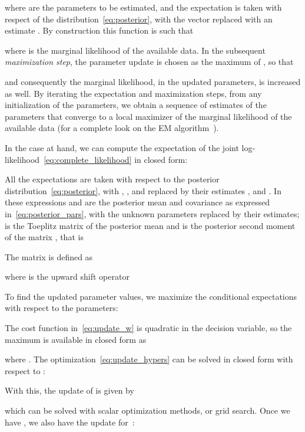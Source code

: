 \documentclass[10pt]{article}
\begin{document}
where  are the parameters to be estimated, and
the expectation is taken with respect of the distribution~\eqref{eq:posterior},
with the vector  replaced with an estimate . By
construction this function
is such that

where  is the marginal likelihood of the available data.
In the subsequent \emph{maximization step}, the parameter update is chosen as
the maximum of , so that

and consequently the marginal likelihood, in the updated parameters, is increased as well.
By iterating the expectation and maximization steps, from any initialization of
the parameters, we obtain a sequence of estimates of the parameters that
converge to a local maximizer of the marginal likelihood of the available data (for a
complete look on the EM algorithm~\cite{mclachlan2007algorithm}).

In the case at hand, we can compute the expectation of the joint log-likelihood~\eqref{eq:complete_likelihood} in closed form:

All the expectations are taken with respect to the posterior
distribution~\eqref{eq:posterior}, with , , and  replaced by
their estimates ,  and . In these
expressions  and   are the posterior mean and covariance as
expressed in~\eqref{eq:posterior_pars}, with the unknown parameters replaced by
their estimates;  is the Toeplitz matrix of the
posterior mean and  is the posterior second moment of the matrix
, that is

The  matrix  is defined as

where  is the  upward shift operator


To find the updated parameter values, we maximize the conditional expectations
with respect to the parameters:


The cost function in~\eqref{eq:update_w} is quadratic in the decision variable,
so the maximum is available in closed form as

where .
The optimization~\eqref{eq:update_hypers} can be solved in closed form with
respect to :

With this, the update of  is given by

which can be solved with scalar optimization methods, or grid search. Once
we have , we also have the update for~:
\end{document}
